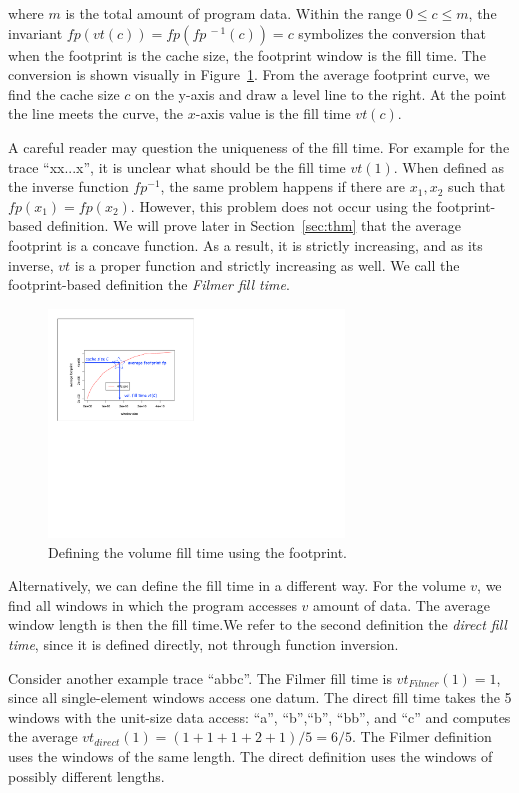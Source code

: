 \noindent where $m$ is the total amount of program data. Within the
range $0 \le c \le m$, the invariant $fp(vt(c)) = fp(fp^{\ -1}(c))= c$
symbolizes the conversion that when the footprint is the cache size,
the footprint window is the fill time. The conversion is shown
visually in Figure~\ref{fig:fp2vt}.  From the average footprint curve,
we find the cache size $c$ on the y-axis and draw a level line to the
right.  At the point the line meets the curve, the $x$-axis value is
the fill time $vt(c)$.

A careful reader may question the uniqueness of the fill time.  For
example for the trace ``xx...x'', it is unclear what should be the fill
time $vt(1)$.  When defined as the inverse function $fp^{-1}$, the same
problem happens if there are $x_1,x_2$ such that $fp(x_1) = fp(x_2)$.
However, this problem does not occur using the footprint-based
definition.  We will prove later in Section~\ref{sec:thm} that the
average footprint is a concave function.  As a result, it is strictly
increasing, and as its inverse, $vt$ is a proper function and strictly
increasing as well.  We call the footprint-based
definition the \emph{Filmer fill time}.

\begin{figure}[t!]
\centering
\includegraphics[width=0.7\textwidth]{figures/model/fp2vt.pdf}
\caption{Defining the volume fill time using the footprint.}
\label{fig:fp2vt}
\end{figure}

Alternatively, we can define the fill time in a different way.  For
the volume $v$, we find all windows in which the program
accesses $v$ amount of data.  The average window length is then the
fill time.We refer to the second definition the \emph{direct fill
  time}, since it is defined directly, not through function inversion.

Consider another example trace ``abbc''. The Filmer fill time is
$vt_{Filmer}(1) = 1$, since all single-element windows access one
datum.  The direct fill time takes the 5 windows with the unit-size
data access: ``a'', ``b'',``b'', ``bb'', and ``c'' and computes the
average $vt_{direct}(1) = (1+1+1+2+1)/5 = 6/5$. The Filmer definition
uses the windows of the same length.  The direct definition uses the
windows of possibly different lengths.

